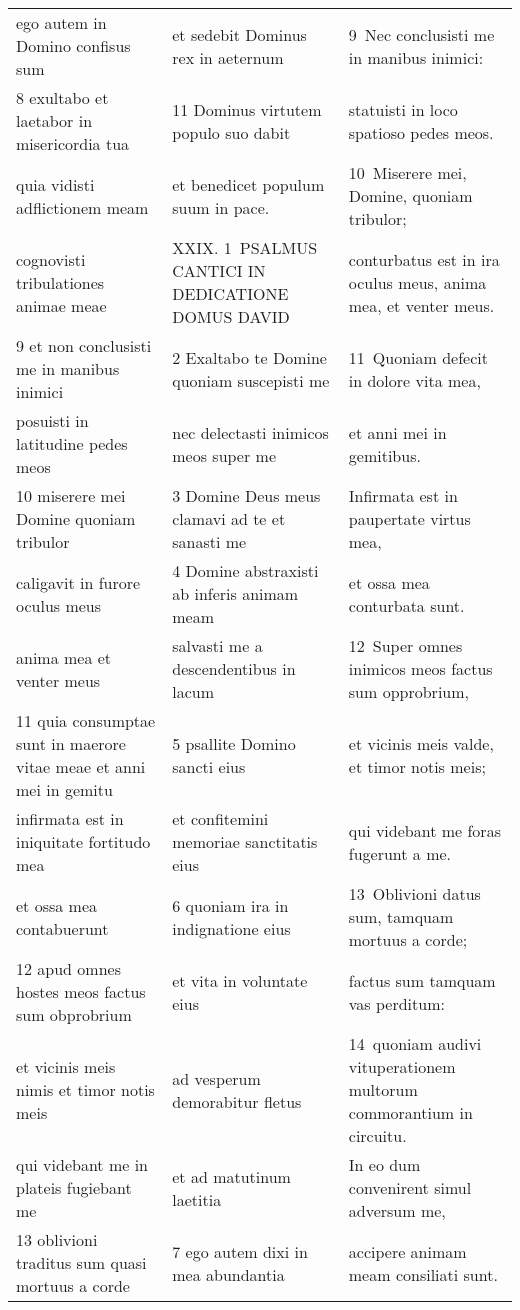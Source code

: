 \documentclass{article}
\begin{document}
\begin{longtable}{@{}p{}p{}p{}@{}}
ego autem in Domino confisus sum	&	et sedebit Dominus rex in aeternum	&	9 Nec conclusisti me in manibus inimici:	\\
8 exultabo et laetabor in misericordia tua	&	11 Dominus virtutem populo suo dabit	&	statuisti in loco spatioso pedes meos.	\\
quia vidisti adflictionem meam	&	et benedicet populum suum in pace.	&	10 Miserere mei, Domine, quoniam tribulor;	\\
cognovisti tribulationes animae meae	&	XXIX. 1 PSALMUS CANTICI IN DEDICATIONE DOMUS DAVID	&	conturbatus est in ira oculus meus, anima mea, et venter meus.	\\
9 et non conclusisti me in manibus inimici	&	2 Exaltabo te Domine quoniam suscepisti me	&	11 Quoniam defecit in dolore vita mea,	\\
posuisti in latitudine pedes meos	&	nec delectasti inimicos meos super me	&	et anni mei in gemitibus.	\\
10 miserere mei Domine quoniam tribulor	&	3 Domine Deus meus clamavi ad te et sanasti me	&	Infirmata est in paupertate virtus mea,	\\
caligavit in furore oculus meus	&	4 Domine abstraxisti ab inferis animam meam	&	et ossa mea conturbata sunt.	\\
anima mea et venter meus	&	salvasti me a descendentibus in lacum	&	12 Super omnes inimicos meos factus sum opprobrium,	\\
11 quia consumptae sunt in maerore vitae meae et anni mei in gemitu	&	5 psallite Domino sancti eius	&	et vicinis meis valde, et timor notis meis;	\\
infirmata est in iniquitate fortitudo mea	&	et confitemini memoriae sanctitatis eius	&	qui videbant me foras fugerunt a me.	\\
et ossa mea contabuerunt	&	6 quoniam ira in indignatione eius	&	13 Oblivioni datus sum, tamquam mortuus a corde;	\\
12 apud omnes hostes meos factus sum obprobrium	&	et vita in voluntate eius	&	factus sum tamquam vas perditum:	\\
et vicinis meis nimis et timor notis meis	&	ad vesperum demorabitur fletus	&	14 quoniam audivi vituperationem multorum commorantium in circuitu.	\\
qui videbant me in plateis fugiebant me	&	et ad matutinum laetitia	&	In eo dum convenirent simul adversum me,	\\
13 oblivioni traditus sum quasi mortuus a corde	&	7 ego autem dixi in mea abundantia	&	accipere animam meam consiliati sunt.	\\

\end{longtable}
\end{document}
